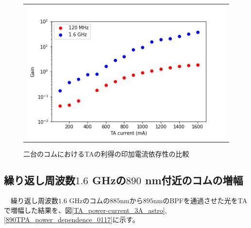 \documentclass[uplatex, dvipdfmx, a4paper, report, papersize, 11pt]{jsbook}
\begin{document}
\begin{figure}[htpb]
\begin{tabular}{c}
      \begin{minipage}{0.50\hsize}
        \centering
          \includegraphics[keepaspectratio,  scale=0.35,  angle=0]
                          {figures/chapter4/TA_cuurent-gain_comparison.png}
                          \caption{二台のコムにおけるTAの利得の印加電流依存性の比較}
                          \label{TA_cuurent-gain_comparison}
      \end{minipage}
    \end{tabular}
\end{figure}
\subsection{繰り返し周波数$1.6$ GHzの$890$ nm付近のコムの増幅}
　繰り返し周波数$1.6$ GHzのコムの$885 \mathrm{nm}から 895 \mathrm{nm}$のBPFを通過させた光をTAで増幅した結果を、図\ref{TA_power-current_3A_astro}, \ref{890TPA_power_dependence_0117}に示す。
\end{document}
